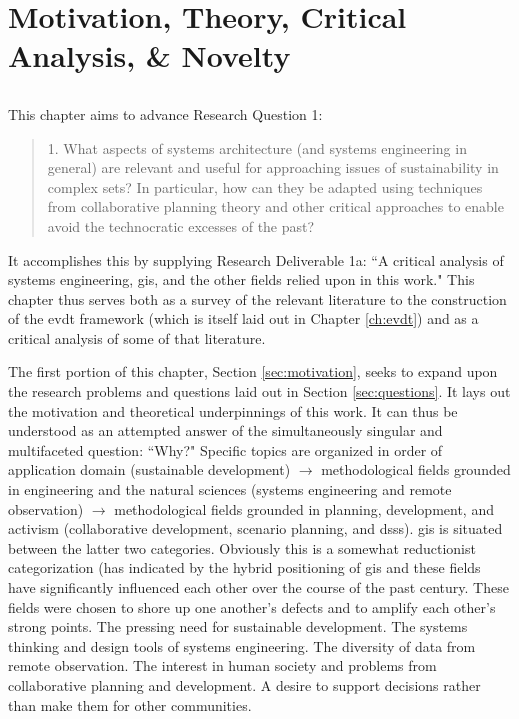 
\chapter{Motivation, Theory, Critical Analysis, \& Novelty} \label{ch:theory}

\section{}

This chapter aims to advance Research Question 1: 

\blockquote{ 1. What aspects of systems architecture (and systems engineering in general) are relevant and useful for approaching issues of sustainability in complex \acf{sets}? In particular, how can they be adapted using techniques from collaborative planning theory and other critical approaches to enable avoid the technocratic excesses of the past?}

It accomplishes this by supplying Research Deliverable 1a: ``A critical analysis of systems engineering, \acf{gis}, and the other fields relied upon in this work." This chapter thus serves both as a survey of the relevant literature to the construction of the \acf{evdt} framework (which is itself laid out in Chapter \ref{ch:evdt}) and as a critical analysis of some of that literature.

The first portion of this chapter, Section \ref{sec:motivation}, seeks to expand upon the research problems and questions laid out in Section \ref{sec:questions}. It lays out the motivation and theoretical underpinnings of this work. It can thus be understood as an attempted answer of the simultaneously singular and multifaceted question: ``Why?" Specific topics are organized in order of application domain (sustainable development) $\rightarrow$ methodological fields grounded in engineering and the natural sciences (systems engineering and remote observation) $\rightarrow$ methodological fields grounded in planning, development, and activism (collaborative development, scenario planning, and \acfp{dss}). \ac{gis} is situated between the latter two categories. Obviously this is a somewhat reductionist categorization (has indicated by the hybrid positioning of \ac{gis} and these fields have significantly influenced each other over the course of the past century. These fields were chosen to shore up one another's defects and to amplify each other's strong points. The pressing need for sustainable development. The systems thinking and design tools of systems engineering. The diversity of data from remote observation. The interest in human society and problems from collaborative planning and development. A desire to support decisions rather than make them for other communities.


